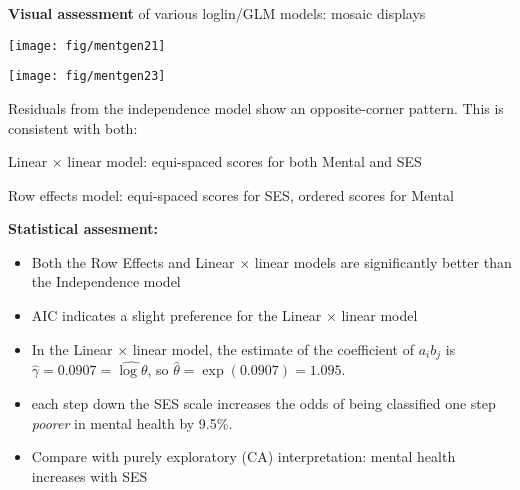 \begin{frame} 
\textbf{Visual assessment} of various loglin/GLM models: mosaic displays
 \begin{minipage}[t]{.49\linewidth}
  \texttt{[image: fig/mentgen21]}
 \end{minipage}%
 \hfill
 \begin{minipage}[t]{.49\linewidth}
  \texttt{[image: fig/mentgen23]}
 \end{minipage}

\begin{itemize*}
\item Residuals from the independence model show an opposite-corner pattern.
This is consistent with both:
	\begin{itemize*}
	\item Linear $\times$ linear model: equi-spaced scores for both Mental and SES
	\item Row effects model: equi-spaced scores for SES, ordered scores for Mental
	\end{itemize*} 
\end{itemize*} 
\end{frame}

\begin{frame}
\textbf{Statistical assesment:}

\begin{itemize}
\item Both the Row Effects and Linear $\times$ linear models are significantly better
than the Independence model
\item AIC indicates a slight preference for the Linear $\times$ linear model
\item In the Linear $\times$ linear model, the estimate of the coefficient
of $ a_i b_j$ is $\hat{\gamma}=0.0907 = \widehat{\log \theta}$, so $\hat{\theta}=\exp(0.0907) = 1.095$.
\item \implies each step down the SES scale increases the odds of being classified
one step \emph{poorer} in mental health by 9.5\%.
\item Compare with purely exploratory (CA) interpretation: mental health increases with SES
\end{itemize} 
\end{frame}


